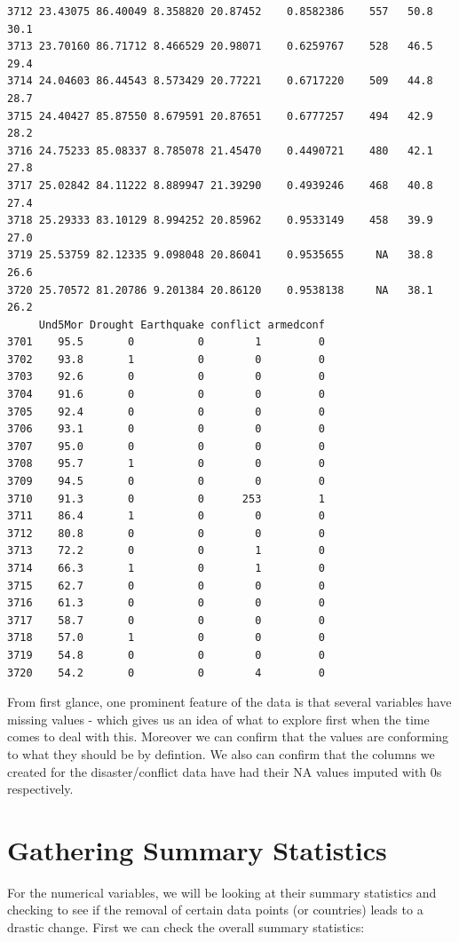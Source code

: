 \documentclass[
  11pt,
  letterpaper,
  DIV=11,
  numbers=noendperiod]{scrartcl}
\begin{document}
\begin{verbatim}
3712 23.43075 86.40049 8.358820 20.87452    0.8582386    557   50.8   30.1
3713 23.70160 86.71712 8.466529 20.98071    0.6259767    528   46.5   29.4
3714 24.04603 86.44543 8.573429 20.77221    0.6717220    509   44.8   28.7
3715 24.40427 85.87550 8.679591 20.87651    0.6777257    494   42.9   28.2
3716 24.75233 85.08337 8.785078 21.45470    0.4490721    480   42.1   27.8
3717 25.02842 84.11222 8.889947 21.39290    0.4939246    468   40.8   27.4
3718 25.29333 83.10129 8.994252 20.85962    0.9533149    458   39.9   27.0
3719 25.53759 82.12335 9.098048 20.86041    0.9535655     NA   38.8   26.6
3720 25.70572 81.20786 9.201384 20.86120    0.9538138     NA   38.1   26.2
     Und5Mor Drought Earthquake conflict armedconf
3701    95.5       0          0        1         0
3702    93.8       1          0        0         0
3703    92.6       0          0        0         0
3704    91.6       0          0        0         0
3705    92.4       0          0        0         0
3706    93.1       0          0        0         0
3707    95.0       0          0        0         0
3708    95.7       1          0        0         0
3709    94.5       0          0        0         0
3710    91.3       0          0      253         1
3711    86.4       1          0        0         0
3712    80.8       0          0        0         0
3713    72.2       0          0        1         0
3714    66.3       1          0        1         0
3715    62.7       0          0        0         0
3716    61.3       0          0        0         0
3717    58.7       0          0        0         0
3718    57.0       1          0        0         0
3719    54.8       0          0        0         0
3720    54.2       0          0        4         0
\end{verbatim}

From first glance, one prominent feature of the data is that several
variables have missing values - which gives us an idea of what to
explore first when the time comes to deal with this. Moreover we can
confirm that the values are conforming to what they should be by
defintion. We also can confirm that the columns we created for the
disaster/conflict data have had their NA values imputed with 0s
respectively.

\section{Gathering Summary
Statistics}\label{gathering-summary-statistics}

For the numerical variables, we will be looking at their summary
statistics and checking to see if the removal of certain data points (or
countries) leads to a drastic change. First we can check the overall
summary statistics:
\end{document}
